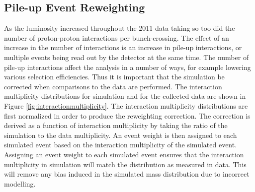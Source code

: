 \subsection{Pile-up Event Reweighting}
As the luminosity increased throughout the 2011 data taking so too did the number of proton-proton interactions per bunch-crossing.
The effect of an increase in the number of interactions is an increase in pile-up interactions, or multiple events being read out by the detector at the same time.
The number of pile-up interactions affect the analysis in a number of ways, for example lowering various selection efficiencies.
Thus it is important that the simulation be corrected when comparisons to the data are performed.
The interaction multiplicity distributions for simulation and for the collected data are shown in Figure \ref{fig:interactionmultiplicity}.
The interaction multiplicity distributions are first normalized in order to produce the reweighting correction.
The correction is derived as a function of interaction multiplicity by taking the ratio of the simulation to the data multiplicity.
An event weight is then assigned to each simulated event based on the interaction multiplicity of the simulated event.%
Assigning an event weight to each simulated event ensures that the interaction multiplicity in simulation will match the distribution as measured in data.
This will remove any bias induced in the simulated mass distribution due to incorrect modelling.

